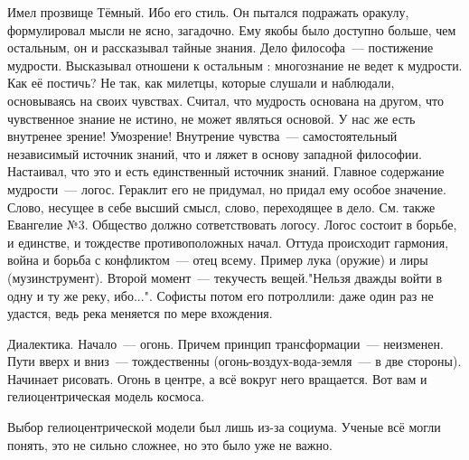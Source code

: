 Имел прозвище Тёмный. Ибо его стиль. Он пытался подражать оракулу, формулировал мысли не ясно, загадочно. 
Ему якобы было доступно больше, чем остальным, он и рассказывал тайные знания. 
Дело философа~--- постижение мудрости. Высказывал отношени к остальным : многознание не ведет к мудрости. Как её постичь? 
Не так, как милетцы, которые слушали и наблюдали, основываясь на своих чувствах. Считал, что мудрость основана на другом, что чувственное знание не истино, не может являться основой. 
У нас же есть внутренее зрение! Умозрение! Внутрение чувства~--- самостоятельный независимый источник знаний, что и ляжет в основу западной философии. Настаивал, что это и есть единственный источник знаний. 
Главное содержание мудрости~--- логос. Гераклит его не придумал, но придал ему особое значение. Слово, несущее в себе высший смысл, слово, переходящее в дело. См. также Евангелие №3. 
Общество должно сответствовать логосу. Логос состоит в борьбе, и единстве, и тождестве противоположных начал. Оттуда происходит гармония, война и борьба с конфликтом~--- отец всему. 
Пример лука (оружие) и лиры (музинструмент). Второй момент~--- текучесть вещей."Нельзя дважды войти в одну и ту же реку, ибо...". Софисты потом его потроллили: даже один раз не удастся, ведь река меняется по мере вхождения. 

Диалектика. 
Начало~--- огонь. Причем принцип трансформации~--- неизменен. Пути вверх и вниз~--- тождественны (огонь-воздух-вода-земля~--- в две стороны). Начинает рисовать. Огонь в центре, а всё вокруг него вращается. Вот вам и гелиоцентрическая модель космоса. 

Выбор гелиоцентрической модели был лишь из-за социума. Ученые всё могли понять, это не сильно сложнее, но это было уже не важно. 
